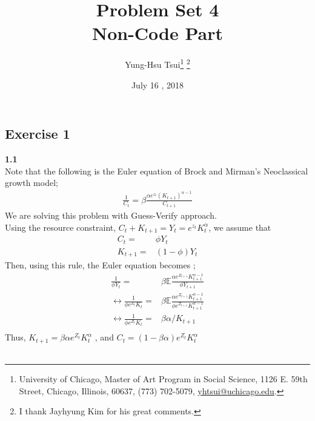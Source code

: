 \documentclass[letterpaper,12pt]{article}
\theoremstyle{definition}
\begin{document}
	
	\title{Problem Set 4\\
		Non-Code Part
	}
	\author{
		Yung-Hsu Tsui\footnote{University of Chicago, Master of Art Program in Social Science, 1126 E. 59th Street, Chicago, Illinois, 60637, (773) 702-5079, \href{mailto:}{yhtsui@uchicago.edu}.} \footnote{I thank Jayhyung Kim for his great comments.}\\[-2pt]
	}
	\date{July 16 ,  2018 }
	\vspace{-9mm}
	\maketitle
	\thispagestyle{empty}
	
	\pagestyle{fancy}
	\fancyhf{}
	\cfoot{\thepage}
	
	\begin{spacing}{1.3}{}
		\vspace{1 mm}

\section*{Exercise 1}

\vspace{5mm}

\noindent\textbf{1.1}\\

Note that the following is the Euler equation of Brock and Mirman's Neoclassical growth model; \\
\begin{align*} 
\frac{1}{C_t} = \beta \frac{\alpha e^{z_t} (K_{t+1})^{\alpha-1}}{C_{t+1}} 
\end{align*}
We are solving this problem with Guess-Verify approach. \\
Using the resource constraint, $C_t + K_{t+1} = Y_t = e^{z_t} K_{t}^{\alpha}$, we assume that \\
\begin{align*}
  C_t =& \phi Y_t  \\
  K_{t+1} =& (1-\phi) Y_t
\end{align*}
Then, using this rule, the Euler equation becomes ; \\
\begin{align*}
  \frac{1}{\phi Y_t} =& \beta \mathbb{E} \frac{\alpha e^{Z_{t+1}} K_{t+1}^{\alpha-1}}{\phi Y_{t+1}} \\
 \leftrightarrow \frac{1}{\phi e^{Z_{t}} K_{t}}  =& \beta \mathbb{E} \frac{\alpha e^{Z_{t+1}} K_{t+1}^{\alpha-1}}{\phi e^{Z_{t+1}} K_{t+1}^{\alpha-1}}  \\
 \leftrightarrow \frac{1}{\phi e^{Z_{t}} K_{t}}   =& \beta \alpha / K_{t+1} \\
\end{align*}
Thus, $K_{t+1} = \beta \alpha e^{Z_t} K_t^{\alpha}$ , and $C_t = (1-\beta \alpha) e^{Z_t} K_{t}^{\alpha}$ \\\\


\end{spacing}
\end{document}
